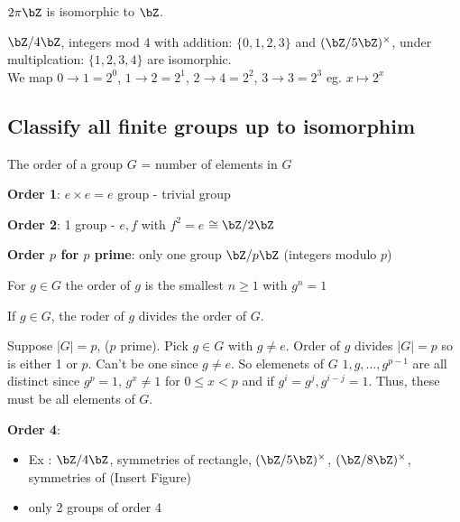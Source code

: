 \begin{example}
    $2 \pi \bZ$ is isomorphic to $\bZ$.
\end{example}

\begin{example}
    $\bZ/4\bZ$, integers mod 4 with addition: $\{0, 1, 2, 3\}$ and $(\bZ/5\bZ)^{\times}$, under multiplcation: $\{1, 2, 3, 4 \}$ are isomorphic. \\
    We map $0 \to 1=2^0$, $1 \to 2 = 2^1$, $2 \to 4=2^2$, $3 \to 3= 2^3$    eg. $x \mapsto 2^x$
\end{example}

\subsection{Classify all finite groups up to isomorphim}

\begin{definition}
    The order of a group $G$ = number of elements in $G$
\end{definition}

\noindent
\textbf{Order 1}: $e \times e = e$  group - trivial group

\noindent 
\textbf{Order 2}: 1 group - $e,f$ with $f^2=e$ $\cong \bZ/2\bZ$ 

\noindent
\textbf{Order $p$ for $p$ prime}: only one group $\bZ/p\bZ$ (integers modulo $p$)

\begin{definition}
    For $g \in G$ the order of $g$ is the smallest $ n \ge 1$ with $g^n=1$
\end{definition}

\begin{theorem}
    If $g \in G$, the roder of $g$ divides the order of $G$. 
\end{theorem}

\begin{example}
    Suppose $|G|=p$, ($p$ prime). Pick $g \in G$ with $g \neq e$. Order of $g$ divides $|G|=p$ so is either 1 or $p$. Can't be one since $g \neq e$. So elemenets of $G$ $1, g, \ldots, g^{p-1}$ are all distinct since $g^p=1$, $g^x \neq 1$ for $0 \le x < p$ and if $g^i = g^j, g^{i-j}=1$. Thus, these must be all elements of $G$. 
\end{example}

\noindent
\textbf{Order 4}: 
\begin{itemize}
    \item Ex : $\bZ/4\bZ$, symmetries of rectangle, $(\bZ/5\bZ)^{\times}$, $(\bZ/8\bZ)^{\times}$, symmetries of (Insert Figure)
    \item only 2 groups of order 4
\end{itemize}